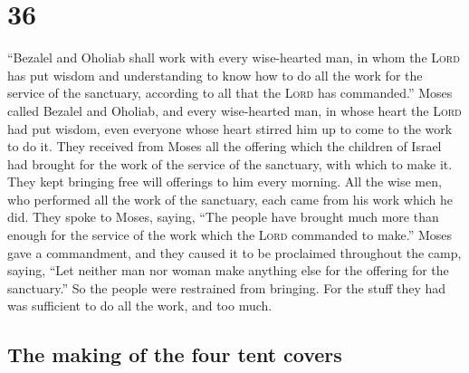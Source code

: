 \hypertarget{section-35}{%
\section{36}\label{section-35}}

 ``Bezalel and Oholiab shall work with every wise-hearted
man, in whom the \textsc{Lord} has put wisdom and understanding to know
how to do all the work for the service of the sanctuary, according to
all that the \textsc{Lord} has commanded.''  Moses called
Bezalel and Oholiab, and every wise-hearted man, in whose heart the
\textsc{Lord} had put wisdom, even everyone whose heart stirred him up
to come to the work to do it.  They received from Moses
all the offering which the children of Israel had brought for the work
of the service of the sanctuary, with which to make it. They kept
bringing free will offerings to him every morning.  All
the wise men, who performed all the work of the sanctuary, each came
from his work which he did.  They spoke to Moses, saying,
``The people have brought much more than enough for the service of the
work which the \textsc{Lord} commanded to make.''  Moses
gave a commandment, and they caused it to be proclaimed throughout the
camp, saying, ``Let neither man nor woman make anything else for the
offering for the sanctuary.'' So the people were restrained from
bringing.  For the stuff they had was sufficient to do all
the work, and too much.

\hypertarget{the-making-of-the-four-tent-covers}{%
\subsection{The making of the four tent
covers}\label{the-making-of-the-four-tent-covers}}

